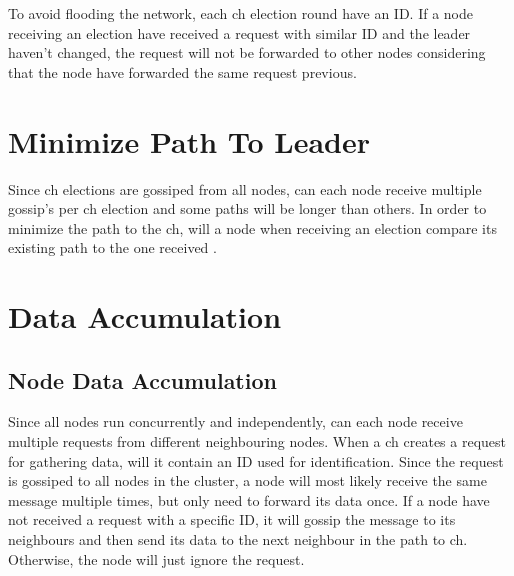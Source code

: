 \documentclass[USenglish]{uit-thesis}
\begin{document}
To avoid flooding the network, each \gls{ch} election round have an ID. If a node receiving an election have received a request with similar ID and the leader haven't changed, the request will not be forwarded to other nodes considering that the node have forwarded the same request previous.


\section{Minimize Path To Leader}
Since \gls{ch} elections are gossiped from all nodes, can each node receive multiple gossip's per \gls{ch} election and some paths will be longer than others. In order to minimize the path to the \gls{ch}, will a node when receiving an election compare its existing path to the one received \cite{dijkstra}.





\section{Data Accumulation}



\subsection{Node Data Accumulation}
Since all nodes run concurrently and independently, can each node receive multiple requests from different neighbouring nodes. When a \gls{ch} creates a request for gathering data, will it contain an ID used for identification. Since the request is gossiped to all nodes in the cluster, a node will most likely receive the same message multiple times, but only need to forward its data once. If a node have not received a request with a specific ID, it will gossip the message to its neighbours and then send its data to the next neighbour in the path to \gls{ch}. Otherwise, the node will just ignore the request.
\end{document}
